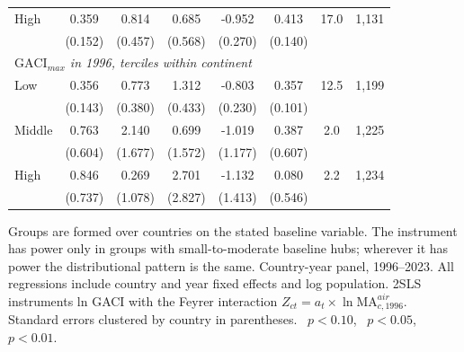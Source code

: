 \begin{table}[p]
\begin{minipage}{\linewidth}
{\begin{tabular}{lccccccc}
\quad High & 0.359\sym{**} & 0.814\sym{*} & 0.685 & -0.952\sym{***} & 0.413\sym{***} & 17.0 & 1{,}131 \\
 & (0.152) & (0.457) & (0.568) & (0.270) & (0.140) \\
\multicolumn{8}{l}{\emph{$\mathrm{GACI}_{max}$ in 1996, terciles within continent}}\\
\quad Low & 0.356\sym{**} & 0.773\sym{**} & 1.312\sym{***} & -0.803\sym{***} & 0.357\sym{***} & 12.5 & 1{,}199 \\
 & (0.143) & (0.380) & (0.433) & (0.230) & (0.101) \\
\quad Middle & 0.763 & 2.140 & 0.699 & -1.019 & 0.387 & 2.0 & 1{,}225 \\
 & (0.604) & (1.677) & (1.572) & (1.177) & (0.607) \\
\quad High & 0.846 & 0.269 & 2.701 & -1.132 & 0.080 & 2.2 & 1{,}234 \\
 & (0.737) & (1.078) & (2.827) & (1.413) & (0.546) \\
\bottomrule
\end{tabular}}
\par\vspace{3pt}\begin{flushleft}\footnotesize Groups are formed over countries on the stated baseline variable. The instrument has power only in groups with small-to-moderate baseline hubs; wherever it has power the distributional pattern is the same. Country-year panel, 1996--2023. All regressions include country and year fixed effects and log population. 2SLS instruments ln GACI with the Feyrer interaction $Z_{ct}=a_t\times\ln \mathrm{MA}^{air}_{c,1996}$. Standard errors clustered by country in parentheses. \sym{*}~$p<0.10$, \sym{**}~$p<0.05$, \sym{***}~$p<0.01$.\end{flushleft}
\end{minipage}
\end{table}
